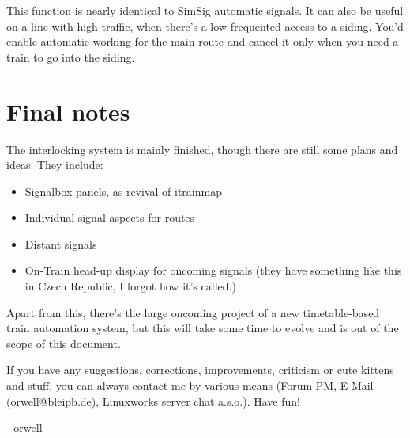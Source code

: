 \documentclass[english]{paper}
\begin{document}
This function is nearly identical to SimSig automatic signals. It
can also be useful on a line with high traffic, when there's a low-frequented
access to a siding. You'd enable automatic working for the main route
and cancel it only when you need a train to go into the siding.

\section{Final notes}

The interlocking system is mainly finished, though there are still
some plans and ideas. They include:
\begin{itemize}
\item Signalbox panels, as revival of itrainmap
\item Individual signal aspects for routes
\item Distant signals
\item On-Train head-up display for oncoming signals (they have something
like this in Czech Republic, I forgot how it's called.)
\end{itemize}
Apart from this, there's the large oncoming project of a new timetable-based
train automation system, but this will take some time to evolve and
is out of the scope of this document.

If you have any suggestions, corrections, improvements, criticism
or cute kittens and stuff, you can always contact me by various means
(Forum PM, E-Mail (orwell@bleipb.de), Linuxworks server chat a.s.o.).
Have fun!

- orwell
\end{document}
